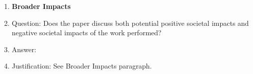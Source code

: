 \begin{enumerate}
\item {\bf Broader Impacts}
    \item[] Question: Does the paper discuss both potential positive societal impacts and negative societal impacts of the work performed?
    \item[] Answer: \answerYes{} %
    \item[] Justification: See Broader Impacts paragraph. 
    

\end{enumerate}
